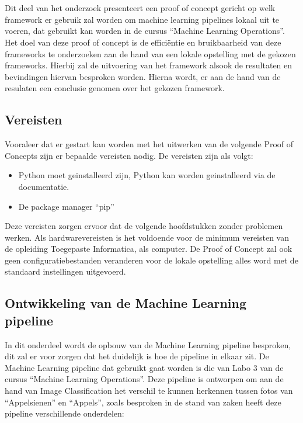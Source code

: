 \chapter{}%
\label{ch:PoC}

Dit deel van het onderzoek presenteert een proof of concept gericht op welk framework er gebruik zal worden om machine learning pipelines lokaal uit te voeren, dat gebruikt kan worden in de cursus ``Machine Learning Operations''.
Het doel van deze proof of concept is de efficiëntie en bruikbaarheid van deze frameworks te onderzoeken aan de hand van een lokale opstelling met de gekozen frameworks. Hierbij zal de uitvoering van het framework alsook de resultaten en bevindingen hiervan besproken worden.
Hierna wordt, er aan de hand van de resulaten een conclusie genomen over het gekozen framework.
\section{Vereisten}


Vooraleer dat er gestart kan worden met het uitwerken van de volgende Proof of Concepts zijn er bepaalde vereisten nodig.
De vereisten zijn als volgt:
\begin{itemize}
    \item Python moet geinstalleerd zijn, Python kan worden geinstalleerd via de documentatie.
    \item De package manager ``pip''
\end{itemize}
Deze vereisten zorgen ervoor dat de volgende hoofdstukken zonder problemen werken.
Als hardwarevereisten is het voldoende voor de minimum vereisten van de opleiding Toegepaste Informatica, als computer.
De Proof of Concept zal ook geen configuratiebestanden veranderen voor de lokale opstelling alles word met de standaard instellingen uitgevoerd.
\section{Ontwikkeling van de Machine Learning pipeline}

In dit onderdeel wordt de opbouw van de Machine Learning pipeline besproken, dit zal er voor zorgen dat het duidelijk is hoe de pipeline in elkaar zit.
De Machine Learning pipeline dat gebruikt gaat worden is die van Labo 3 van de cursus ``Machine Learning Operations''. Deze pipeline is ontworpen om aan de hand van Image Classification het verschil te kunnen herkennen tussen fotos van ``Appelsienen'' en ``Appels'', zoals besproken in de stand van zaken heeft deze pipeline verschillende onderdelen:

